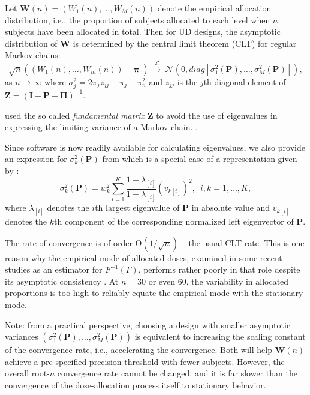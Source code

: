 Let $\mathbf{W}(n)=\left(W_1(n),\ldots ,W_M(n)\right)$ denote the empirical allocation distribution, i.e., the proportion of subjects allocated to each level when $n$ subjects have been allocated in total. Then for UD designs, the asymptotic distribution of $\mathbf{W}$ is determined by the central limit theorem (CLT) for regular Markov chains:
%
\begin{equation}\label{eq:CLT}
\sqrt{n}\left(\left(W_1(n),\ldots, W_m(n)\right)-\boldsymbol{\pi}^\prime\right)\,
\stackrel{\mathcal{L}}\longrightarrow
\ \mathcal{N}\left(0,diag\left[\sigma_1^2(\mathbf{P})
,\ldots ,\sigma_M^2(\mathbf{P})\right] \right),
\end{equation}
as $n\rightarrow \infty$ where $\sigma^2_j=2\pi_jz_{jj}-\pi_j-\pi_n^2$ and $z_{jj}$ is the $j$th diagonal element of  $\mathbf{Z}=(\mathbf{I}-\mathbf{P}+\boldsymbol{\Pi})^{-1}$.

\cite{Frec:1938} used the so called \textit{fundamental
matrix} $\mathbf{Z}$ to avoid the use of
eigenvalues in expressing the limiting variance of a Markov chain.
 \citep[see also Chapter 11, pg 464]{Grin:Snel:Intr:1997}.

 Since software is now readily available for calculating eigenvalues, we also provide
 an
expression for $\sigma_k^2(\mathbf{P})$ from
 \cite{Bort:Giov:Upan:2005}  which is a special case of a representation given by
 \cite{Pesk:opti:1973}:
\begin{equation}\label{eq:MCrxvar}
\sigma_k^2(\mathbf{P})=w_k^2\sum_{i=1}^K\frac{1+\lambda_{[i]}}{1-\lambda_{[i]}}
\left(v_{k[i]}\right)^2,\,\,\,i,k=1,\ldots,K,
\end{equation}
where $\lambda_{[i]}$ denotes the $i$th largest eigenvalue of {$\mathbf
P$} in absolute value and $v_{k[i]}$ denotes the $k$th component of
the corresponding normalized left eigenvector of ${\mathbf{P}}$.


%
The rate of convergence is of order $\mathrm{O}\left(1/\sqrt{n}\right)$ -- the usual CLT rate. This is one reason why the empirical mode of allocated doses, examined in some recent studies as an estimator for $F^{-1}(\Gamma)$, performs rather poorly in that role despite its asymptotic consistency \citep{Giov:Pint:Pint:prop:1998}. At $n=30$ or even $60$, the variability in allocated proportions is too high to reliably equate the empirical mode with the stationary mode.

Note: from a practical perspective, choosing a design with smaller asymptotic variances $\left(\sigma_1^2(\mathbf{P}),\ldots,\sigma_M^2(\mathbf{P})\right)$ is equivalent to increasing the scaling constant of the convergence rate, i.e., accelerating the convergence. Both will help $\mathbf{W}(n)$ achieve a pre-specified precision threshold with fewer subjects. However, the overall root-$n$ convergence rate cannot be changed, and it is far slower than the convergence of the dose-allocation process itself to stationary behavior.

